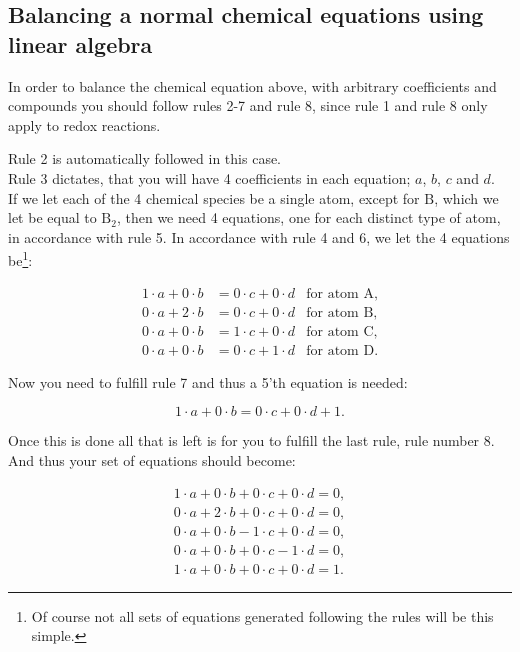 \documentclass[a4paper]{article}
\begin{document}
\subsection{Balancing a normal chemical equations using linear algebra}

In order to balance the chemical equation above, with arbitrary coefficients and compounds you should follow rules 2-7 and rule 8, since rule 1 and rule 8 only apply to redox reactions.

Rule 2 is automatically followed in this case.\\
Rule 3 dictates, that you will have 4 coefficients in each equation; $a$, $b$, $c$ and $d$.\\
If we let each of the 4 chemical species be a single atom, except for $\text{B}$, which we let be equal to $\text{B}_2$, then we need 4 equations, one for each distinct type of atom, in accordance with rule 5. In accordance with rule 4 and 6, we let the 4 equations be\footnote{Of course not all sets of equations generated following the rules will be this simple.}:

\begin{align*}
	1 \cdot a + 0 \cdot b &= 0 \cdot c + 0 \cdot d & \text{for atom $\text{A}$},\\
	0 \cdot a + 2 \cdot b &= 0 \cdot c + 0 \cdot d & \text{for atom $\text{B}$},\\
	0 \cdot a + 0 \cdot b &= 1 \cdot c + 0 \cdot d & \text{for atom $\text{C}$},\\
	0 \cdot a + 0 \cdot b &= 0 \cdot c + 1 \cdot d & \text{for atom $\text{D}$}.
\end{align*}

Now you need to fulfill rule 7 and thus a 5'th equation is needed:

$$1 \cdot a + 0 \cdot b = 0 \cdot c + 0 \cdot d + 1.$$

Once this is done all that is left is for you to fulfill the last rule, rule number 8. And thus your set of equations should become:

\begin{align*}
	1 \cdot a + 0 \cdot b + 0 \cdot c + 0 \cdot d = 0,\\
	0 \cdot a + 2 \cdot b + 0 \cdot c + 0 \cdot d = 0,\\
	0 \cdot a + 0 \cdot b - 1 \cdot c + 0 \cdot d = 0,\\
	0 \cdot a + 0 \cdot b + 0 \cdot c - 1 \cdot d = 0,\\
	1 \cdot a + 0 \cdot b + 0 \cdot c + 0 \cdot d = 1.
\end{align*}
\end{document}
